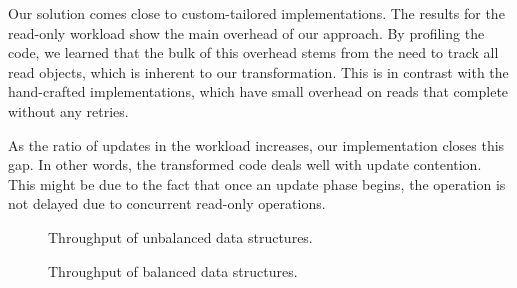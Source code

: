 

Our solution comes close to custom-tailored implementations.
The results for the read-only workload show the main overhead
of our approach. By profiling the code, we learned
that the bulk of this overhead stems from the need to track all read objects,
which is inherent to our transformation.
This is in contrast with the hand-crafted implementations,
which have small overhead on reads that complete without any retries. 


As the ratio of updates in the workload increases, our implementation
closes this gap.
In other words, the transformed code deals well with update contention.
This might be due to the fact that once
an update phase begins, the operation is not delayed due to concurrent
read-only operations.



\begin{figure*}
\begin{center}

\end{center}
\caption{Throughput of unbalanced data structures.}
\label{evaluation:results:unbalanced}
\end{figure*}


\begin{figure*}
\begin{center}

\end{center}
\caption{Throughput of balanced data
structures.}
\label{evaluation:results:balanced}
\end{figure*}

